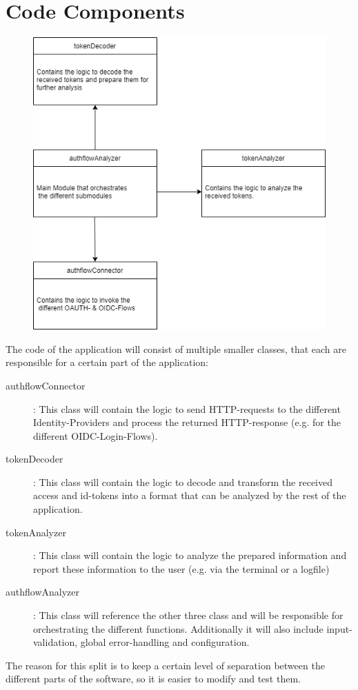 \documentclass[12pt, a4paper]{article}
\begin{document}
\newpage
\section{Code Components}
\begin{figure}[!h]
    \centering
    \includegraphics[width=\textwidth]{Code-Components}
\end{figure}

The code of the application will consist of multiple smaller classes, that each are responsible for a certain part of the application:
\begin{description}
\item[authflowConnector]: This class will contain the logic to send HTTP-requests to the different Identity-Providers and process the returned HTTP-response (e.g. for the different OIDC-Login-Flows).
\item[tokenDecoder]: This class will contain the logic to decode and transform the received access and id-tokens into a format that can be analyzed by the rest of the application.
\item[tokenAnalyzer]: This class will contain the logic to analyze the prepared information and report these information to the user (e.g. via the terminal or a logfile)
\item[authflowAnalyzer]: This class will reference the other three class and will be responsible for orchestrating the different functions. Additionally it will also include input-validation, global error-handling and configuration.
\end{description}
The reason for this split is to keep a certain level of separation between the different parts of the software, so it is easier to modify and test them.
\end{document}
